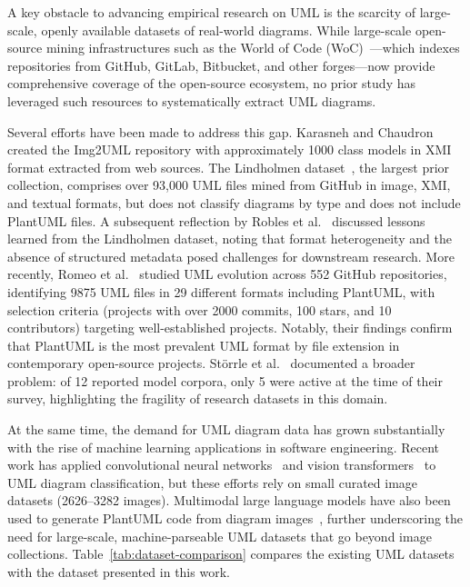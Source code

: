 \documentclass[11pt]{article}
\begin{document}
A key obstacle to advancing empirical research on UML is the scarcity of large-scale, openly available datasets of real-world diagrams. While large-scale open-source mining infrastructures such as the World of Code (WoC)~\cite{ma2021world}---which indexes repositories from GitHub, GitLab, Bitbucket, and other forges---now provide comprehensive coverage of the open-source ecosystem, no prior study has leveraged such resources to systematically extract UML diagrams.

Several efforts have been made to address this gap. Karasneh and Chaudron~\cite{karasneh2013img2uml} created the Img2UML repository with approximately 1000 class models in XMI format extracted from web sources. The Lindholmen dataset~\cite{hebig2016quest,robles2017extensive}, the largest prior collection, comprises over 93,000 UML files mined from GitHub in image, XMI, and textual formats, but does not classify diagrams by type and does not include PlantUML files. A subsequent reflection by Robles et al.~\cite{robles2023reflection} discussed lessons learned from the Lindholmen dataset, noting that format heterogeneity and the absence of structured metadata posed challenges for downstream research. More recently, Romeo et al.~\cite{romeo2025uml} studied UML evolution across 552 GitHub repositories, identifying 9875 UML files in 29 different formats including PlantUML, with selection criteria (projects with over 2000 commits, 100 stars, and 10 contributors) targeting well-established projects. Notably, their findings confirm that PlantUML is the most prevalent UML format by file extension in contemporary open-source projects. St\"{o}rrle et al.~\cite{storrle2014index} documented a broader problem: of 12 reported model corpora, only 5 were active at the time of their survey, highlighting the fragility of research datasets in this domain.

At the same time, the demand for UML diagram data has grown substantially with the rise of machine learning applications in software engineering. Recent work has applied convolutional neural networks~\cite{gosala2021classification} and vision transformers~\cite{groundtruth2024} to UML diagram classification, but these efforts rely on small curated image datasets (2626--3282 images). Multimodal large language models have also been used to generate PlantUML code from diagram images~\cite{camara2024image,bates2025umlcodegen}, further underscoring the need for large-scale, machine-parseable UML datasets that go beyond image collections. Table~\ref{tab:dataset-comparison} compares the existing UML datasets with the dataset presented in this work.
\end{document}
